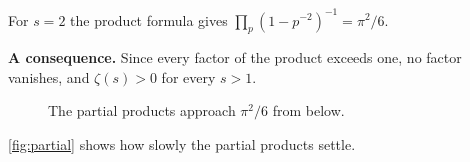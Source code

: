 \begin{example}
For $s = 2$ the product formula gives $\prod_p (1 - p^{-2})^{-1} = \pi^2/6$.
\end{example}

{\bf A consequence.} Since every factor of the product exceeds one, no
factor vanishes, and $\zeta(s) > 0$ for every $s > 1$.

\begin{figure}[t]
  \centering
  \caption{The partial products approach $\pi^2/6$ from below.}
  \label{fig:partial}
\end{figure}
\FloatBarrier

\autoref{fig:partial} shows how slowly the partial products settle.
